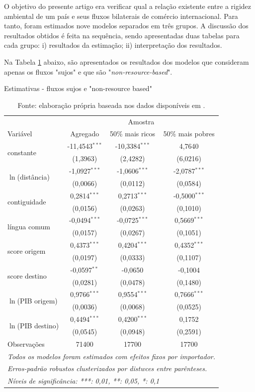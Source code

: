O objetivo do presente artigo era verificar qual a relação existente entre a rigidez ambiental de um país e seus fluxos bilaterais de comércio internacional. Para tanto, foram estimados nove modelos separados em três grupos. A discussão dos resultados obtidos é feita na sequência, sendo apresentadas duas tabelas para cada grupo: i) resultados da estimação; ii) interpretação dos resultados. 

Na Tabela \ref{tab:resultados_nrb} abaixo, são apresentados os resultados dos modelos que consideram apenas os fluxos "sujos"  e que são "\textit{non-resource-based}".
\begin{table}[H]
\centering
\caption{Estimativas - fluxos sujos e "non-resource based"}
\label{tab:resultados_nrb}
\begin{tabular}{lccc}
 & \multicolumn{3}{c}{Amostra} \\ \cmidrule(l){2-4} 
Variável & Agregado & 50\% mais ricos & 50\% mais pobres \\ \midrule
\multirow{2}{*}{constante} & -11,4543$^{***}$ & -10,3384$^{***}$ & 4,7640 \\
 & (1,3963) & (2,4282) & (6,0216) \\
\multirow{2}{*}{$\ln$(distância)} & -1,0927$^{***}$ & -1,0606$^{***}$ & -2,0787$^{***}$ \\
 & (0,0066) & (0,0112) & (0,0584) \\
\multirow{2}{*}{contiguidade} & 0,2814$^{***}$ & 0,2713$^{***}$ & -0,5000$^{***}$ \\
 & (0,0156) & (0,0263) & (0,1010) \\
\multirow{2}{*}{língua comum} & -0,0494$^{***}$ & -0,0725$^{***}$ & 0,5669$^{***}$ \\
 & (0,0157) & (0,0267) & (0,1051) \\
\multirow{2}{*}{score origem} & 0,4373$^{***}$ & 0,4204$^{***}$ & 0,4352$^{***}$ \\
 & (0,0197) & (0,0333) & (0,1107) \\
\multirow{2}{*}{score destino} & -0,0597$^{**}$ & -0,0650 & -0,1004 \\
 & (0,0281) & (0,0478) & (0,1480) \\
\multirow{2}{*}{$\ln$(PIB origem)} & 0,9766$^{***}$ & 0,9554$^{***}$ & 0,7666$^{***}$ \\
 & (0,0036) & (0,0068) & (0,0525) \\
\multirow{2}{*}{$\ln$(PIB destino)} & 0,4494$^{***}$ & 0,4200$^{***}$ & 0,1752 \\
 & (0,0545) & (0,0948) & (0,2591) \\ \midrule
Observações& 71400&17700&17700\\
\bottomrule\bottomrule
\multicolumn{4}{l}{\emph{Todos os modelos foram estimados com efeitos fixos por importador.}}\\
\multicolumn{4}{l}{\emph{Erros-padrão robustos clusterizados por distwces entre parênteses.}}\\
\multicolumn{4}{l}{\emph{Níveis de significância: ***: 0,01, **: 0,05, *: 0,1}}\\
\end{tabular}
\caption*{\RaggedRight  Fonte: elaboração própria baseada nos dados disponíveis em \cite{Cepii2019, Comtrade2019, WorldBank2019}.} 
\end{table}
